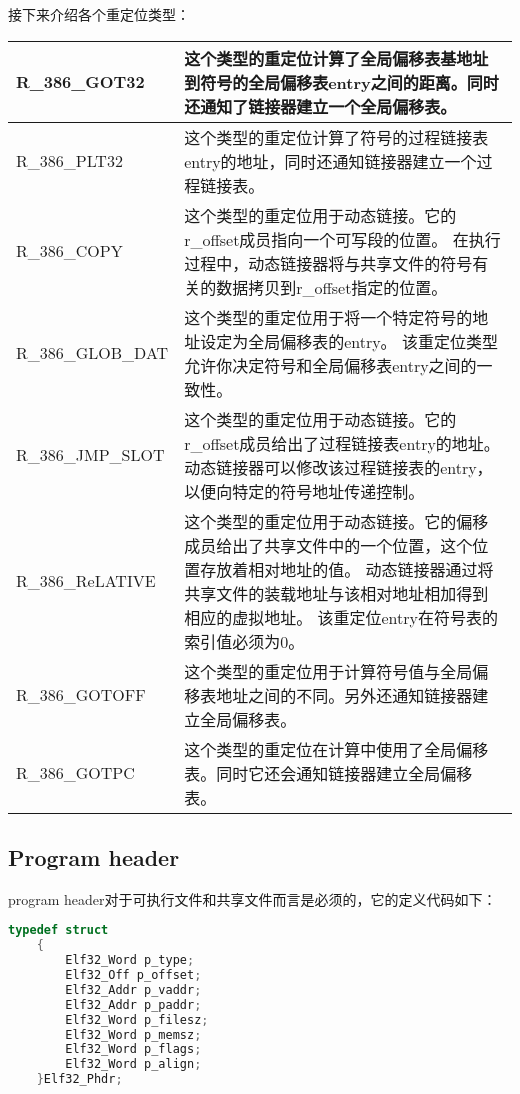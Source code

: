 \documentclass[a4paper,left=2.5cm,right=2.5cm,11pt]{article}
\newcommand{\interval}{\vspace{0.5em}}
\begin{document}
	接下来介绍各个重定位类型：
	\interval
	\begin{longtable}{p{3cm}p{8cm}}
	\hline
	R\_386\_GOT32 & 这个类型的重定位计算了全局偏移表基地址到符号的全局偏移表entry之间的距离。同时还通知了链接器建立一个全局偏移表。\\
	\hline
	R\_386\_PLT32 & 这个类型的重定位计算了符号的过程链接表entry的地址，同时还通知链接器建立一个过程链接表。\\
	\hline
	R\_386\_COPY & 这个类型的重定位用于动态链接。它的r\_offset成员指向一个可写段的位置。
					在执行过程中，动态链接器将与共享文件的符号有关的数据拷贝到r\_offset指定的位置。\\
	\hline
	R\_386\_GLOB\_DAT & 这个类型的重定位用于将一个特定符号的地址设定为全局偏移表的entry。
					    该重定位类型允许你决定符号和全局偏移表entry之间的一致性。\\
	\hline
	R\_386\_JMP\_SLOT & 这个类型的重定位用于动态链接。它的r\_offset成员给出了过程链接表entry的地址。
						动态链接器可以修改该过程链接表的entry，以便向特定的符号地址传递控制。\\
	\hline
	R\_386\_ReLATIVE & 这个类型的重定位用于动态链接。它的偏移成员给出了共享文件中的一个位置，这个位置存放着相对地址的值。
					   动态链接器通过将共享文件的装载地址与该相对地址相加得到相应的虚拟地址。
					   该重定位entry在符号表的索引值必须为0。\\
	\hline
	R\_386\_GOTOFF & 这个类型的重定位用于计算符号值与全局偏移表地址之间的不同。另外还通知链接器建立全局偏移表。\\
	\hline
	R\_386\_GOTPC & 这个类型的重定位在计算中使用了全局偏移表。同时它还会通知链接器建立全局偏移表。\\
	\end{longtable}
	\interval

\subsection{Program header}
	program header对于可执行文件和共享文件而言是必须的，它的定义代码如下：
	\begin{lstlisting}[language = C]
	typedef struct
	{
		Elf32_Word p_type;
		Elf32_Off p_offset;
		Elf32_Addr p_vaddr;
		Elf32_Addr p_paddr;
		Elf32_Word p_filesz;
		Elf32_Word p_memsz;
		Elf32_Word p_flags;
		Elf32_Word p_align;
	}Elf32_Phdr;
	\end{lstlisting}
\end{document}
